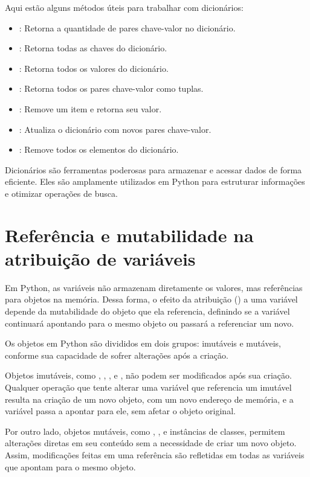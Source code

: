 Aqui estão alguns métodos úteis para trabalhar com dicionários:
\begin{itemize}
\item {}: Retorna a quantidade de pares chave-valor no dicionário.
\item {}: Retorna todas as chaves do dicionário.
\item {}: Retorna todos os valores do dicionário.
\item {}: Retorna todos os pares chave-valor como tuplas.
\item {}: Remove um item e retorna seu valor.
\item {}: Atualiza o dicionário com novos pares chave-valor.
\item {}: Remove todos os elementos do dicionário.
\end{itemize}

Dicionários são ferramentas poderosas para armazenar e acessar dados de forma eficiente.
Eles são amplamente utilizados em Python para estruturar informações e otimizar operações de busca.





\section{Referência e mutabilidade na atribuição de variáveis}

Em Python, as variáveis não armazenam diretamente os valores, mas referências para objetos na memória.
Dessa forma, o efeito da atribuição (\inlcode{=}) a uma variável depende da mutabilidade do objeto que ela
referencia, definindo se a variável continuará apontando para o mesmo objeto ou passará a referenciar um novo.

Os objetos em Python são divididos em dois grupos: imutáveis e mutáveis, conforme sua capacidade de sofrer alterações
após a criação.

Objetos imutáveis, como , , ,  e , não podem ser
modificados após sua criação.
Qualquer operação que tente alterar uma variável que referencia um imutável resulta na criação de um novo objeto,
com um novo endereço de memória, e a variável passa a apontar para ele, sem afetar o objeto original.


Por outro lado, objetos mutáveis, como , ,  e instâncias de classes, permitem
alterações diretas em seu conteúdo sem a necessidade de criar um novo objeto.
Assim, modificações feitas em uma referência são refletidas em todas as variáveis que apontam para o mesmo objeto.

